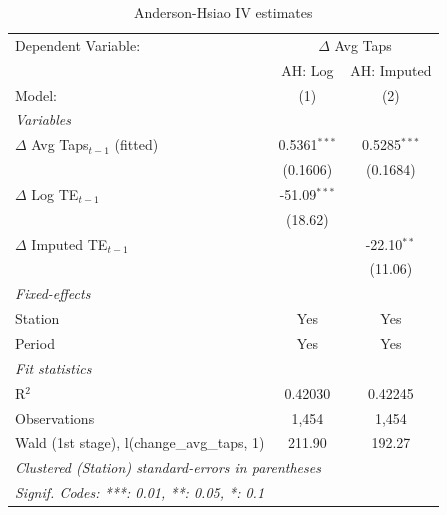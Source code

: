 
\begin{table}[htbp]
   \caption{\label{tab:ah_results} Anderson-Hsiao IV estimates}
   \centering
   \footnotesize
   \begin{tabular}{lcc}
      \tabularnewline \midrule \midrule
      Dependent Variable: & \multicolumn{2}{c}{$\Delta$ Avg Taps}\\
                                                  & AH: Log        & AH: Imputed \\   
      Model:                                      & (1)            & (2)\\  
      \midrule
      \emph{Variables}\\
      $\Delta$ Avg Taps$_{t-1}$ (fitted)          & 0.5361$^{***}$ & 0.5285$^{***}$\\   
                                                  & (0.1606)       & (0.1684)\\   
      $\Delta$ Log TE$_{t-1}$                     & -51.09$^{***}$ &   \\   
                                                  & (18.62)        &   \\   
      $\Delta$ Imputed TE$_{t-1}$                 &                & -22.10$^{**}$\\   
                                                  &                & (11.06)\\   
      \midrule
      \emph{Fixed-effects}\\
      Station                                     & Yes            & Yes\\  
      Period                                      & Yes            & Yes\\  
      \midrule
      \emph{Fit statistics}\\
      R$^2$                                       & 0.42030        & 0.42245\\  
      Observations                                & 1,454          & 1,454\\  
      Wald (1st stage), l(change\_avg\_taps, 1)   & 211.90         & 192.27\\  
      \midrule \midrule
      \multicolumn{3}{l}{\emph{Clustered (Station) standard-errors in parentheses}}\\
      \multicolumn{3}{l}{\emph{Signif. Codes: ***: 0.01, **: 0.05, *: 0.1}}\\
   \end{tabular}
\end{table}


